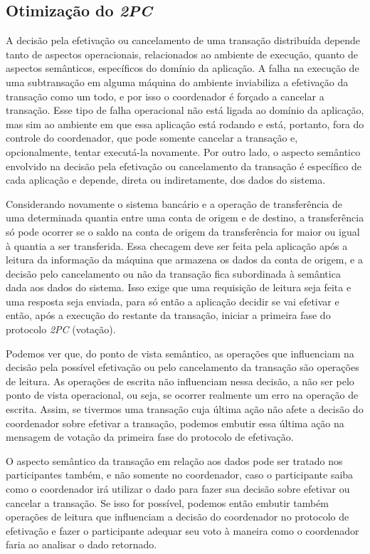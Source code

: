 \documentclass[11pt,twoside,a4paper]{book}
\begin{document}
\subsection{Otimização do \emph{2PC}}
\label{subsec:derivando-minitransacoes}
A decisão pela efetivação ou cancelamento de uma transação distribuída depende tanto de aspectos operacionais, relacionados ao ambiente de execução, quanto de aspectos semânticos, específicos do domínio da aplicação. A falha na execução de uma subtransação em alguma máquina do ambiente inviabiliza a efetivação da transação como um todo, e por isso o coordenador é forçado a cancelar a transação. Esse tipo de falha operacional não está ligada ao domínio da aplicação, mas sim ao ambiente em que essa aplicação está rodando e está, portanto, fora do controle do coordenador, que pode somente cancelar a transação e, opcionalmente, tentar executá-la novamente. Por outro lado, o aspecto semântico envolvido na decisão pela efetivação ou cancelamento da transação é específico de cada aplicação e depende, direta ou indiretamente, dos dados do sistema.

Considerando novamente o sistema bancário e a operação de transferência de uma determinada quantia entre uma conta de origem e de destino, a transferência só pode ocorrer se o saldo na conta de origem da transferência for maior ou igual à quantia a ser transferida. Essa checagem deve ser feita pela aplicação após a leitura da informação da máquina que armazena os dados da conta de origem, e a decisão pelo cancelamento ou não da transação fica subordinada à semântica dada aos dados do sistema. Isso exige que uma requisição de leitura seja feita e uma resposta seja enviada, para só então a aplicação decidir se vai efetivar e então, após a execução do restante da transação, iniciar a primeira fase do protocolo \emph{2PC} (votação).

Podemos ver que, do ponto de vista semântico, as operações que influenciam na decisão pela possível efetivação ou pelo cancelamento da transação são operações de leitura. As operações de escrita não influenciam nessa decisão, a não ser pelo ponto de vista operacional, ou seja, se ocorrer realmente um erro na operação de escrita. Assim, se tivermos uma transação cuja última ação não afete a decisão do coordenador sobre efetivar a transação, podemos embutir essa última ação na mensagem de votação da primeira fase do protocolo de efetivação.

O aspecto semântico da transação em relação aos dados pode ser tratado nos participantes também, e não somente no coordenador, caso o participante saiba como o coordenador irá utilizar o dado para fazer sua decisão sobre efetivar ou cancelar a transação. Se isso for possível, podemos então embutir também operações de leitura que influenciam a decisão do coordenador no protocolo de efetivação e fazer o participante adequar seu voto à maneira como o coordenador faria ao analisar o dado retornado.
\end{document}
